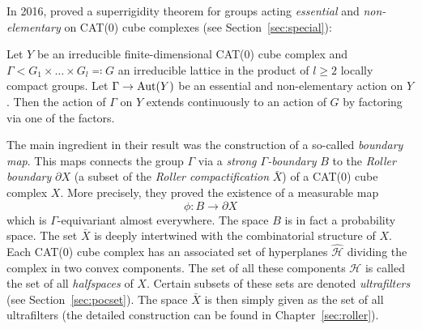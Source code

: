 In 2016, \textcite{MR3509968} proved a superrigidity theorem for groups acting \emph{essential} and \emph{non-elementary} on CAT(0) cube complexes (see Section~\ref{sec:special}):

\begin{thm}[{\cite[Theorem 1.5]{MR3509968}}]
  Let \(Y\) be an irreducible finite-dimensional CAT(0) cube complex and \(\Gamma < G_1 \times \dots \times G_l \eqqcolon G\) an irreducible lattice in the product of \(l \geq 2\) locally compact groups. Let \(\Gamma \to \operatorname{Aut}(Y)\) be an essential and non-elementary action on \(Y\). Then the action of \(\Gamma\) on \(Y\) extends continuously to an action of \(G\) by factoring via one of the factors.
\end{thm}

The main ingredient in their result was the construction of a so-called \emph{boundary map}. This maps connects the group \(\Gamma\) via a \emph{strong \(\Gamma\)-boundary} \(B\) to the \emph{Roller boundary} \(\partial X\) (a subset of the \emph{Roller compactification} \(\bar X\)) of a CAT(0) cube complex \(X\). More precisely, they proved the existence of a measurable map
\[
  \phi\colon B \to \partial X
\]
which is \(\Gamma\)-equivariant almost everywhere. The space \(B\) is in fact a probability space. The set \(\bar X\) is deeply intertwined with the combinatorial structure of \(X\). Each CAT(0) cube complex has an associated set of hyperplanes \(\mathcal{\hat H}\) dividing the complex in two convex components. The set of all these components \(\mathcal{H}\) is called the set of all \emph{halfspaces} of \(X\). Certain subsets of these sets are denoted \emph{ultrafilters} (see Section~\ref{sec:pocset}). The space \(\bar X\) is then simply given as the set of all ultrafilters (the detailed construction can be found in Chapter~\ref{sec:roller}).

